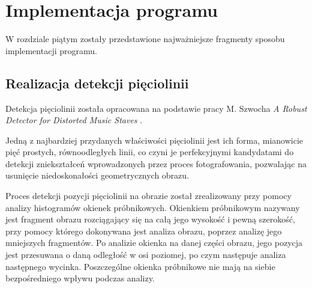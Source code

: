 \chapter{Implementacja programu}
W rozdziale piątym zostały przedstawione najważniejsze fragmenty sposobu implementacji programu. 

\section{Realizacja detekcji pięciolinii}

Detekcja pięciolinii została opracowana na podstawie pracy M. Szwocha \textit{A Robust Detector for Distorted Music Staves} \cite{Szwoch2005}.

Jedną z najbardziej przydanych właściwości pięciolinii jest ich forma, mianowicie pięć prostych, równoodległych linii, co czyni je perfekcyjnymi kandydatami do detekcji zniekształceń wprowadzonych przez proces fotografowania, pozwalając na usunięcie niedoskonałości geometrycznych obrazu.

Proces detekcji pozycji pięciolinii na obrazie został zrealizowany przy pomocy analizy histogramów okienek próbnikowych. Okienkiem próbnikowym nazywany jest fragment obrazu rozciągający się na całą jego wysokość i pewną szerokość, przy pomocy którego dokonywana jest analiza obrazu, poprzez analizę jego mniejszych fragmentów. Po analizie okienka na danej części obrazu, jego pozycja jest przesuwana o daną odległość w osi poziomej, po czym następuje analiza następnego wycinka. Poszczególne okienka próbnikowe nie mają na siebie bezpośredniego wpływu podczas analizy.


